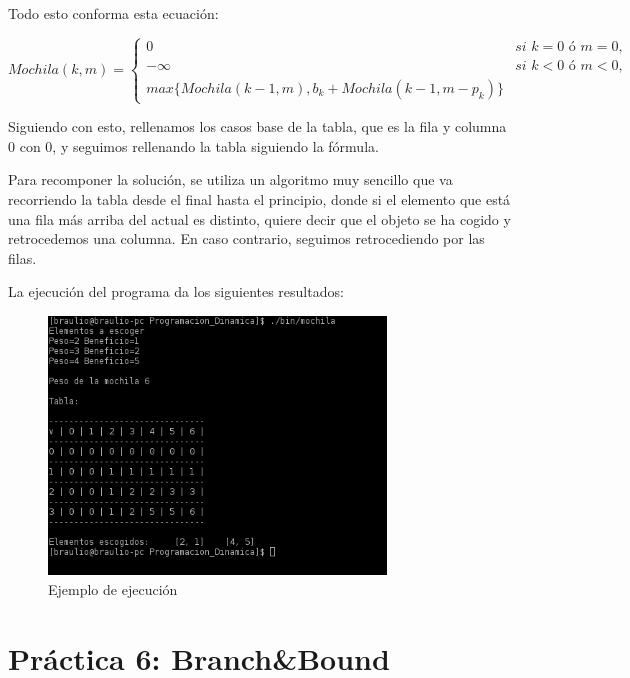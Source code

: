 \documentclass[10pt,a4paper,spanish]{report}
\begin{document}
Todo esto conforma esta ecuación:

\begin{equation*}
Mochila(k,m)= 
\begin{cases}
0 & \textit{si } k = 0 \textit{ ó } m=0, \\
-\infty & \textit{si } k < 0 \textit{ ó } m < 0, \\
max\{Mochila(k-1,m), b_k + Mochila(k-1, m-p_k)\} &
\end{cases}
\end{equation*}

Siguiendo con esto, rellenamos los casos base de la tabla, que es la fila y columna 0 con 0, y seguimos rellenando la tabla siguiendo la fórmula.

Para recomponer la solución, se utiliza un algoritmo muy sencillo que va recorriendo la tabla desde el final hasta el principio, donde si el elemento que está una fila más arriba del actual es distinto, quiere decir que el objeto se ha cogido y retrocedemos una columna. En caso contrario, seguimos retrocediendo por las filas.


La ejecución del programa da los siguientes resultados:

\begin{center}
\begin{figure}[!h]
\centering
\includegraphics[width=0.8\textwidth]{figura4}
\caption{Ejemplo de ejecución}
\label{figura4}
\end{figure}
\end{center}

\chapter{\textcolor[rgb]{0.1,0.2,1}Práctica 6: Branch\&Bound}
\label{bb}
\end{document}
